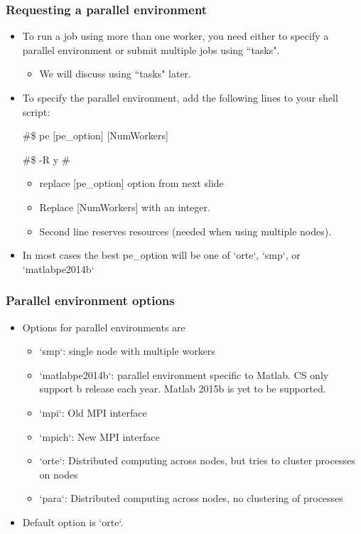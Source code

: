 \documentclass{beamer}
\begin{document}
\begin{frame}[fragile]
\frametitle{Requesting a parallel environment}
\begin{itemize}
\item To run a job using more than one worker, you need either to specify a parallel environment or submit multiple jobs using ``tasks".
\begin{itemize}
\item We will discuss using ``tasks" later.
\end{itemize}
\item To specify the parallel environment, add the following lines to your shell script: \vspace{.2cm}
\begin{semiverbatim}
\#\$ pe [pe\_option] [NumWorkers]  
\end{semiverbatim}
\vspace{-0.4cm}
\begin{semiverbatim}
\#\$ -R y  \# 
\end{semiverbatim}
\begin{itemize}
\item replace [pe\_option] option from next slide
\item Replace [NumWorkers] with an integer.
\item Second line reserves resources (needed when using multiple nodes).
\end{itemize}
\item In most cases the best pe\_option will be one of `orte`, `smp`, or `matlabpe2014b`
\end{itemize}
\end{frame}

\begin{frame}[fragile]
\frametitle{Parallel environment options}
\begin{itemize}
\item Options for parallel environments are
\begin{itemize}
\item `smp`: single node with multiple workers
\item `matlabpe2014b`: parallel environment specific to Matlab. CS only support b release each year. Matlab 2015b is yet to be supported.
\item `mpi`: Old MPI interface
\item `mpich`: New MPI interface
\item `orte`: Distributed computing across nodes, but tries to cluster processes on nodes
\item `para`: Distributed computing across nodes, no clustering of processes
\end{itemize}
\item Default option is `orte`.
\end{itemize}
\end{frame}
\end{document}
